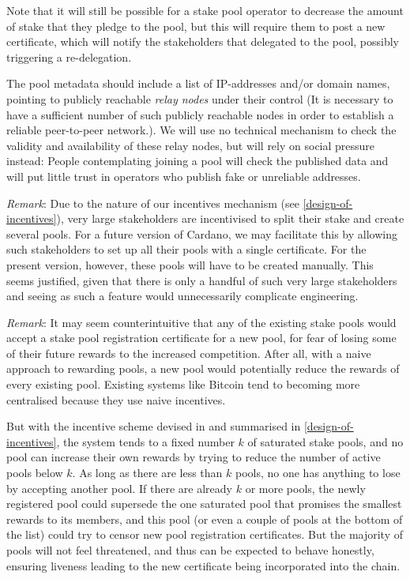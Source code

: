 \documentclass[11pt,a4paper]{article}
\begin{document}
Note that it will still be possible for a stake pool operator to
decrease the amount of stake that they pledge to the pool, but this will
require them to post a new certificate, which will notify the
stakeholders that delegated to the pool, possibly triggering a
re-delegation.

The pool metadata should include a list of IP-addresses and/or domain
names, pointing to publicly reachable \emph{relay nodes} under their
control (It is necessary to have a sufficient number of such publicly
reachable nodes in order to establish a reliable peer-to-peer
network.). We will use no technical mechanism to check the validity
and availability of these relay nodes, but will rely on social
pressure instead: People contemplating joining a pool will check the
published data and will put little trust in operators who publish fake
or unreliable addresses.

\emph{Remark}: Due to the nature of our incentives mechanism (see
\cref{design-of-incentives}), very large stakeholders are
incentivised to split their stake and create several pools. For a future
version of Cardano, we may facilitate this by allowing such
stakeholders to set up all their pools with a single certificate. For
the present version, however, these pools will have to be created
manually. This seems justified, given that there is only a handful of
such very large stakeholders and seeing as such a feature would
unnecessarily complicate engineering.

\emph{Remark}: It may seem counterintuitive that any of the existing stake pools
would accept a stake pool registration certificate for a new pool, for fear of
losing some of their future rewards to the increased competition. After all,
with a naive approach to rewarding pools, a new pool would potentially reduce
the rewards of every existing pool. Existing systems like Bitcoin tend to
becoming more centralised because they use naive incentives.

But with the incentive scheme devised in \citep{bkks2018} and summarised in
\cref{design-of-incentives}, the system tends to a fixed number \(k\) of
saturated stake pools, and no pool can increase their own rewards by trying to
reduce the number of active pools below \(k\). As long as there are less than
\(k\) pools, no one has anything to lose by accepting another pool. If there are
already \(k\) or more pools, the newly registered pool could supersede the one
saturated pool that promises the smallest rewards to its members, and this pool
(or even a couple of pools at the bottom of the list) could try to censor new
pool registration certificates. But the majority of pools will not feel
threatened, and thus can be expected to behave honestly, ensuring liveness
leading to the new certificate being incorporated into the chain.
\end{document}
